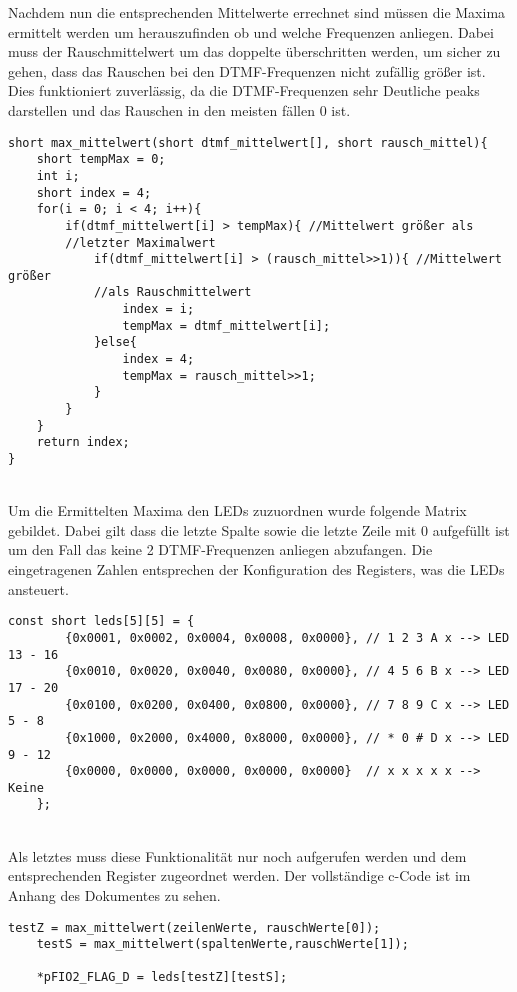 Nachdem nun die entsprechenden Mittelwerte errechnet sind müssen die Maxima ermittelt werden um herauszufinden ob und welche Frequenzen anliegen. Dabei muss der Rauschmittelwert um das doppelte überschritten werden, um sicher zu gehen, dass das Rauschen bei den DTMF-Frequenzen nicht zufällig größer ist. Dies funktioniert zuverlässig, da die DTMF-Frequenzen sehr Deutliche peaks darstellen und das Rauschen in den meisten fällen 0 ist.\\
 \begin{adjustbox}{width=\textwidth, keepaspectratio} 
  \label{code:procdataKompFIR}
  \begin{lstlisting}[title=Bestimmung der Maxima]
short max_mittelwert(short dtmf_mittelwert[], short rausch_mittel){
	short tempMax = 0;
	int i; 
	short index = 4;
	for(i = 0; i < 4; i++){
		if(dtmf_mittelwert[i] > tempMax){ //Mittelwert größer als 
		//letzter Maximalwert
			if(dtmf_mittelwert[i] > (rausch_mittel>>1)){ //Mittelwert größer 
			//als Rauschmittelwert 
				index = i;
				tempMax = dtmf_mittelwert[i];
			}else{
				index = 4;
				tempMax = rausch_mittel>>1;
			}
		}
	}
	return index;
}
\end{lstlisting}
\end{adjustbox}\\
Um die Ermittelten Maxima den LEDs zuzuordnen wurde folgende Matrix gebildet. Dabei gilt dass die letzte Spalte sowie die letzte Zeile mit 0 aufgefüllt ist um den Fall das keine 2 DTMF-Frequenzen anliegen abzufangen. Die eingetragenen Zahlen entsprechen der Konfiguration des Registers, was die LEDs ansteuert.\\
 \begin{adjustbox}{width=\textwidth, keepaspectratio} 
  \label{code:procdataKompFIR}
  \begin{lstlisting}[title=Zuordnung zu den LEDs]
const short leds[5][5] = {
		{0x0001, 0x0002, 0x0004, 0x0008, 0x0000}, // 1 2 3 A x --> LED 13 - 16
		{0x0010, 0x0020, 0x0040, 0x0080, 0x0000}, // 4 5 6 B x --> LED 17 - 20
		{0x0100, 0x0200, 0x0400, 0x0800, 0x0000}, // 7 8 9 C x --> LED 5 - 8
		{0x1000, 0x2000, 0x4000, 0x8000, 0x0000}, // * 0 # D x --> LED 9 - 12
		{0x0000, 0x0000, 0x0000, 0x0000, 0x0000}  // x x x x x --> Keine
	};
\end{lstlisting}
\end{adjustbox}\\
Als letztes muss diese Funktionalität nur noch aufgerufen werden und dem entsprechenden Register zugeordnet werden. Der vollständige c-Code ist im Anhang des Dokumentes zu sehen.\\\par
 \begin{adjustbox}{ keepaspectratio} 
  \label{code:procdataKompFIR}
  \begin{lstlisting}[title=Konfiguration Register]
	testZ = max_mittelwert(zeilenWerte, rauschWerte[0]);
	testS = max_mittelwert(spaltenWerte,rauschWerte[1]);
	
	*pFIO2_FLAG_D = leds[testZ][testS];
	
\end{lstlisting}
\end{adjustbox}\\
